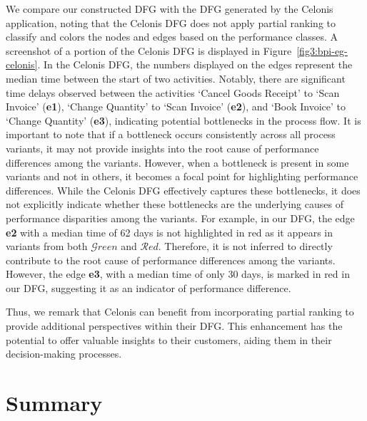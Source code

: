 \documentclass[acmsmall,screen, review]{acmart}
\begin{document}
We compare our constructed DFG with the DFG generated by the Celonis application, noting that the Celonis DFG does not apply partial ranking to classify and colors the nodes and edges based on the performance classes. A screenshot of a portion of the Celonis DFG is displayed in Figure~\ref{fig3:bpi-eg-celonis}. In the Celonis DFG, the numbers displayed on the edges represent the median time between the start of two activities. Notably, there are significant time delays observed between the activities `Cancel Goods Receipt' to `Scan Invoice' (\textbf{e1}), `Change Quantity' to `Scan Invoice' (\textbf{e2}), and `Book Invoice' to `Change Quantity' (\textbf{e3}), indicating potential bottlenecks in the process flow. It is important to note that if a bottleneck occurs consistently across all process variants, it may not provide insights into the root cause of performance differences among the variants. However, when a bottleneck is present in some variants and not in others, it becomes a focal point for highlighting performance differences. While the Celonis DFG effectively captures these bottlenecks, it does not explicitly indicate whether these bottlenecks are the underlying causes of performance disparities among the variants. For example, in our DFG, the edge \textbf{e2} with a median time of 62 days is not highlighted in red as it appears in variants from both $\mathcal{G}reen$ and $\mathcal{R}ed$. Therefore, it is not inferred to directly contribute to the root cause of performance differences among the variants. However, the edge \textbf{e3}, with a median time of only 30 days, is marked in red in our DFG, suggesting it as an indicator of performance difference.

Thus, we remark that Celonis can benefit from incorporating partial ranking to provide additional perspectives within their DFG. This enhancement has the potential to offer valuable insights to their customers, aiding them in their decision-making processes.





\section{Summary}
\label{sec3:con}
\end{document}
